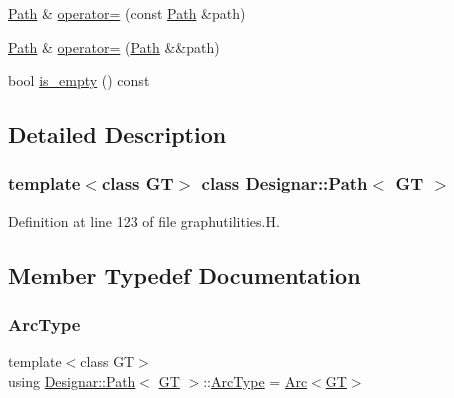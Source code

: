\begin{DoxyCompactItemize}
\item 
\hyperlink{class_designar_1_1_path}{Path} \& \hyperlink{class_designar_1_1_path_a9b358572a872b993a4cdad651cc2bf58}{operator=} (const \hyperlink{class_designar_1_1_path}{Path} \&path)
\item 
\hyperlink{class_designar_1_1_path}{Path} \& \hyperlink{class_designar_1_1_path_af84a6745c52225e5588db4a2ed5d828e}{operator=} (\hyperlink{class_designar_1_1_path}{Path} \&\&path)
\item 
bool \hyperlink{class_designar_1_1_path_a80167d17fbc206944b05293253c95df0}{is\+\_\+empty} () const
\end{DoxyCompactItemize}


\subsection{Detailed Description}
\subsubsection*{template$<$class GT$>$\newline
class Designar\+::\+Path$<$ G\+T $>$}



Definition at line 123 of file graphutilities.\+H.



\subsection{Member Typedef Documentation}
\mbox{\label{class_designar_1_1_path_a6e13966351659cedcf3233098b2b7384}} 
\subsubsection{\texorpdfstring{Arc\+Type}{ArcType}}
{\footnotesize\ttfamily template$<$class GT$>$ \\
using \hyperlink{class_designar_1_1_path}{Designar\+::\+Path}$<$ \hyperlink{demo-buildgraph_8_c_a3001c40d2c31ca87ed96cd7d1334a55e}{GT} $>$\+::\hyperlink{class_designar_1_1_path_a6e13966351659cedcf3233098b2b7384}{Arc\+Type} =  \hyperlink{namespace_designar_a3f55fb5513d62ff47cbc8f72b8e95d6f}{Arc}$<$\hyperlink{demo-buildgraph_8_c_a3001c40d2c31ca87ed96cd7d1334a55e}{GT}$>$}



